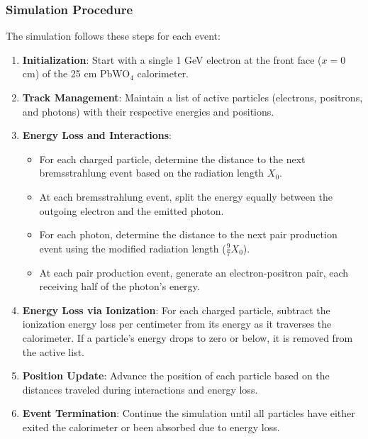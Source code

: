 \documentclass[twocolumn]{aastex631}
\begin{document}
\subsubsection{Simulation Procedure}

The simulation follows these steps for each event:

\begin{enumerate}
    \item \textbf{Initialization}: Start with a single 1 GeV electron at the front face (\(x = 0\) cm) of the 25 cm PbWO\(_4\) calorimeter.
    
    \item \textbf{Track Management}: Maintain a list of active particles (electrons, positrons, and photons) with their respective energies and positions.
    
    \item \textbf{Energy Loss and Interactions}:
    \begin{itemize}
        \item For each charged particle, determine the distance to the next bremsstrahlung event based on the radiation length \(X_0\).
        \item At each bremsstrahlung event, split the energy equally between the outgoing electron and the emitted photon.
        \item For each photon, determine the distance to the next pair production event using the modified radiation length (\(\frac{9}{7} X_0\)).
        \item At each pair production event, generate an electron-positron pair, each receiving half of the photon's energy.
    \end{itemize}
    
    \item \textbf{Energy Loss via Ionization}: For each charged particle, subtract the ionization energy loss per centimeter from its energy as it traverses the calorimeter. If a particle's energy drops to zero or below, it is removed from the active list.
    
    \item \textbf{Position Update}: Advance the position of each particle based on the distances traveled during interactions and energy loss.
    
    \item \textbf{Event Termination}: Continue the simulation until all particles have either exited the calorimeter or been absorbed due to energy loss.
\end{enumerate}
\end{document}
